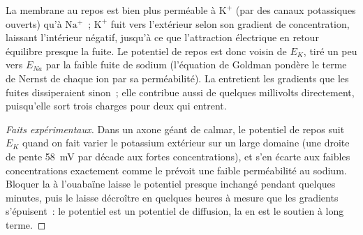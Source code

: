 \begin{proposition}\label{prop:b1:membranes-transport:resting}
La membrane au repos est bien plus perméable à $\mathrm{K^+}$ (par des
canaux potassiques ouverts) qu'à $\mathrm{Na^+}$~; $\mathrm{K^+}$ fuit
vers l'extérieur selon son gradient de concentration, laissant
l'intérieur négatif, jusqu'à ce que l'attraction électrique en retour
équilibre presque la fuite. Le potentiel de repos est donc voisin de
$E_K$, tiré un peu vers $E_{Na}$ par la faible fuite de sodium
(l'équation de Goldman pondère le terme de Nernst de chaque ion par sa
perméabilité). La  entretient les gradients que les fuites
dissiperaient sinon~; elle contribue aussi de quelques millivolts
directement, puisqu'elle sort trois charges pour deux qui entrent.
\end{proposition}
\begin{proof}[Faits expérimentaux]
Dans un axone géant de calmar, le potentiel de repos suit $E_K$ quand on
fait varier le potassium extérieur sur un large domaine (une droite de
pente \qty{58}{mV} par décade aux fortes concentrations), et s'en écarte
aux faibles concentrations exactement comme le prévoit une faible
perméabilité au sodium. Bloquer la  à l'ouabaïne laisse le
potentiel presque inchangé pendant quelques minutes, puis le laisse
décroître en quelques heures à mesure que les gradients s'épuisent~: le
potentiel est un potentiel de diffusion, la  en est le soutien à
long terme.
\end{proof}

